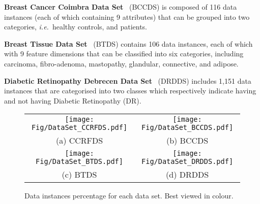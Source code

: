\documentclass{article}
\newcommand{\zzie}{\emph{i.e.}~}
\newcommand*{\1}{\textcolor{magenta}}
\begin{document}
	\textbf{Breast Cancer Coimbra Data Set}~\cite{BreastCancerCoimbraDS2018} (BCCDS) is composed of 116 data instances (each of which containing 9 attributes) that can be grouped into two categories, \zzie healthy controls, and patients.
	
	\textbf{Breast Tissue Data Set}~\cite{BeastTissueDS2010} (BTDS) contains 106 data instances, each of which with 9 feature dimensions that can be classified into six categories, including carcinoma, fibro-adenoma, mastopathy, glandular, connective, and adipose.
	
\textbf{Diabetic Retinopathy Debrecen Data Set}~\cite{DiabeticRetinopathyDebrecenDS2014} (DRDDS) includes 1,151 data instances that are categorised into two classes which respectively indicate having and not having Diabetic Retinopathy (DR).
	\begin{figure}[!ht]
		\setlength{\tabcolsep}{-8pt}
		\centering
		\begin{tabular}{cc}
			\hspace{-0.3em}\texttt{[image: Fig/DataSet\_CCRFDS.pdf]} & \texttt{[image: Fig/DataSet\_BCCDS.pdf]}\\
			(a) CCRFDS & (b) BCCDS\\
			\hspace{-0.3em}\texttt{[image: Fig/DataSet\_BTDS.pdf]} & \texttt{[image: Fig/DataSet\_DRDDS.pdf]}\\
			(c) BTDS & (d) DRDDS
		\end{tabular}
		\caption{Data instances percentage for each data set. Best viewed in colour.}
		\label{fig:DS}
	\end{figure}
	
\end{document}
